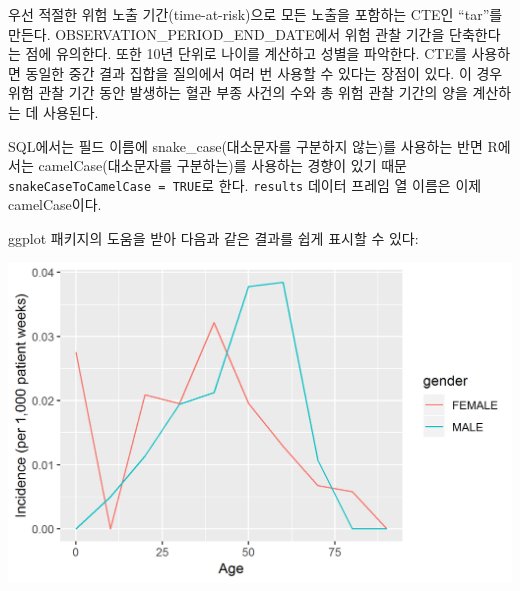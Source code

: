 \documentclass[11pt]{book}
\newenvironment{Shaded}{\begin{snugshade}}{\end{snugshade}}
\newcommand{\KeywordTok}[1]{\textcolor[rgb]{0.13,0.29,0.53}{\textbf{#1}}}
\newcommand{\DataTypeTok}[1]{\textcolor[rgb]{0.13,0.29,0.53}{#1}}
\newcommand{\DecValTok}[1]{\textcolor[rgb]{0.00,0.00,0.81}{#1}}
\newcommand{\StringTok}[1]{\textcolor[rgb]{0.31,0.60,0.02}{#1}}
\newcommand{\CommentTok}[1]{\textcolor[rgb]{0.56,0.35,0.01}{\textit{#1}}}
\newcommand{\OperatorTok}[1]{\textcolor[rgb]{0.81,0.36,0.00}{\textbf{#1}}}
\newcommand{\NormalTok}[1]{#1}
\theoremstyle{definition}
\theoremstyle{definition}
\theoremstyle{definition}
\theoremstyle{remark}
\begin{document}
우선 적절한 위험 노출 기간(time-at-risk)으로 모든 노출을 포함하는 CTE인
``tar''를 만든다. OBSERVATION\_PERIOD\_END\_DATE에서 위험 관찰 기간을
단축한다는 점에 유의한다. 또한 10년 단위로 나이를 계산하고 성별을
파악한다. CTE를 사용하면 동일한 중간 결과 집합을 질의에서 여러 번 사용할
수 있다는 장점이 있다. 이 경우 위험 관찰 기간 동안 발생하는 혈관 부종
사건의 수와 총 위험 관찰 기간의 양을 계산하는 데 사용된다.

SQL에서는 필드 이름에 snake\_case(대소문자를 구분하지 않는)를 사용하는
반면 R에서는 camelCase(대소문자를 구분하는)를 사용하는 경향이 있기 때문
\texttt{snakeCaseToCamelCase\ =\ TRUE}로 한다. \texttt{results} 데이터
프레임 열 이름은 이제 camelCase이다.

ggplot 패키지의 도움을 받아 다음과 같은 결과를 쉽게 표시할 수 있다:

\begin{Shaded}
\end{Shaded}

\begin{center}\includegraphics[width=0.8\linewidth]{images/SqlAndR/ir} \end{center}
\end{document}
